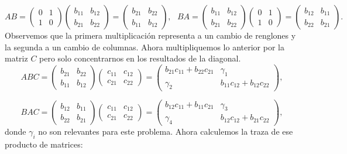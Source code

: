\documentclass[11pt,letterpaper]{article}
\begin{document}
\begin{enumerate}
\begin{equation*}
AB=\left( \begin{array}{cc}
0&1 \\
1&0
\end{array} \right)\left( \begin{array}{cc}
b_{11}&b_{12} \\
b_{21}&b_{22}
\end{array} \right)=\left( \begin{array}{cc}
b_{21}&b_{22} \\
b_{11}&b_{12}
\end{array} \right), \ \ \ BA=\left( \begin{array}{cc}
b_{11}&b_{12} \\
b_{21}&b_{22}
\end{array} \right)\left( \begin{array}{cc}
0&1 \\
1&0
\end{array} \right)=\left( \begin{array}{cc}
b_{12}&b_{11} \\
b_{22}&b_{21}
\end{array} \right).
\end{equation*}
Observemos que la primera multiplicación representa a un cambio de renglones y la segunda a un cambio de columnas. Ahora multipliquemos lo anterior por la matriz $C$ pero solo concentrarnos en los resultados de la diagonal. 
\begin{equation*}
ABC=\left( \begin{array}{cc}
b_{21}&b_{22} \\
b_{11}&b_{12}
\end{array} \right)\left( \begin{array}{cc}
c_{11}&c_{12} \\
c_{21}&c_{22}
\end{array} \right)=
\left( \begin{array}{cc}
b_{21}c_{11}+b_{22}c_{21} & \gamma_1\\
\gamma_2&b_{11}c_{12}+b_{12}c_{22}
\end{array} \right),
\end{equation*}

\begin{equation*}
BAC=\left( \begin{array}{cc}
b_{12}&b_{11} \\
b_{22}&b_{21}
\end{array} \right)\left( \begin{array}{cc}
c_{11}&c_{12} \\
c_{21}&c_{22}
\end{array} \right)=
\left( \begin{array}{cc}
b_{12}c_{11}+b_{11}c_{21}&\gamma_3 \\
\gamma_4& b_{12}c_{12}+b_{21}c_{22}
\end{array} \right),
\end{equation*}
donde $\gamma_i$ no son relevantes para este problema. Ahora calculemos la traza de ese producto de matrices:


\end{enumerate}
\end{document}
